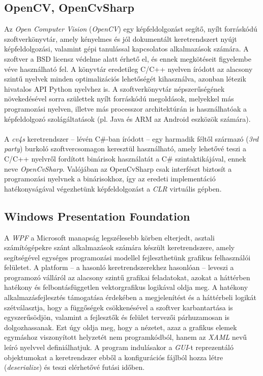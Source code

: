 \subsection{OpenCV, OpenCvSharp}

Az \emph{Open Computer Vision} (\emph{OpenCV}) egy képfeldolgozást segítő, nyílt forráskódú szoftverkönyvtár, amely kényelmes és jól dokumentált keretrendszert nyújt képfeldolgozási, valamint gépi tanulással kapcsolatos alkalmazások számára. A szoftver a BSD licensz védelme alatt érhető el, és ennek megkötéseit figyelembe véve használható fel. A könyvtár eredetileg C/C++ nyelven íródott az alacsony szintű nyelvek minden optimalizációs lehetőségét kihasználva, azonban létezik hivatalos API Python nyelvhez is. A szoftverkönyvtár népszerűségének növekedésével sorra születtek nyílt forráskódú megoldások, melyekkel más programozási nyelven, illetve más processzor architektúrán is használhatóak a képfeldolgozó szolágáltatások (pl. Java és ARM az Android eszközök számára).\\
\\
A \emph{cv4s} keretrendszer -- lévén C\#-ban íródott -- egy harmadik féltől származó (\textit{3rd party}) burkoló szoftvercsomagon keresztül használható, amely lehetővé teszi a C/C++ nyelvről fordított binárisok használatát a C\# szintaktikájával, ennek neve \emph{OpenCvSharp}. Valójában az OpenCvSharp csak interfészt biztosít a programozási nyelvnek a binárisokhoz, így az eredeti implementáció hatékonyságával végezhetünk képfeldolgozást a \emph{CLR} virtuális gépben.

\subsection{Windows Presentation Foundation} \label{subs:wpf_intro}

A \emph{WPF} a Microsoft manapság legszélesebb körben elterjedt, asztali számítógépekre szánt alkalmazások számára készült keretrendszere, amely segítségével egységes programozási modellel fejleszthetünk grafikus felhasználói felületet. A platform -- a hasonló keretrendszerekhez hasonlóan -- leveszi a programozó válláról az alacsony szintű grafikai feladatokat, azokat a háttérben hatékony és felbontásfüggetlen vektorgrafikus logikával oldja meg. A hatékony alkalmazásfejlesztés támogatása érdekében a megjelenítést és a háttérbeli logikát szétválasztja, hogy a függőségek csökkenésével a szoftver karbantartása is egyszerűsödjön, valamint a fejlesztők és felület tervezői párhuzamosan is dolgozhassanak. Ezt úgy oldja meg, hogy a nézetet, azaz a grafikus elemek egymáshoz viszonyított helyzetét nem programkódból, hanem az \emph{XAML} nevű leíró nyelvvel definiálhatjuk. A program indulásakor a \emph{GUI}-t reprezentáló objektumokat a keretrendszer ebből a konfigurációs fájlból hozza létre (\emph{deserialize}) és teszi elérhetővé futási időben. 

